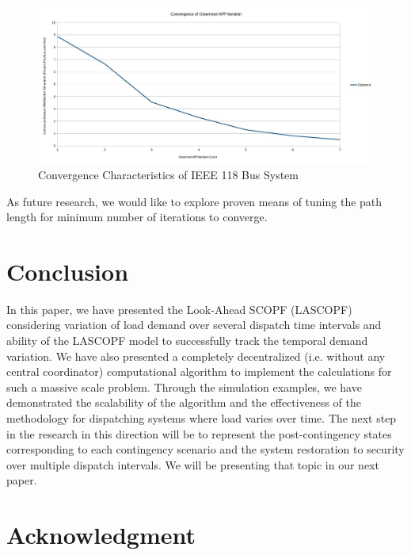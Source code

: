 \documentclass[preprint,12pt,3p]{elsarticle}
\begin{document}
	\begin{figure}
		\begin{center}
			\includegraphics[width=0.92\linewidth,trim=5mm 12mm 5mm 5mm, clip]{N-1_SCOPF_118_Bus.jpg}
			\caption{Convergence Characteristics of IEEE 118 Bus System}
			\label{118Conv}
		\end{center}
	\end{figure}
	\fi
	As future research, we would like to explore proven means of tuning the path length for minimum number of iterations to converge.
	\section{Conclusion}
	\label{conclusion}
	In this paper, we have presented the Look-Ahead SCOPF (LASCOPF) considering variation of load demand over several dispatch time intervals and ability of the LASCOPF model to successfully track the temporal demand variation. We have also presented a completely decentralized (i.e. without any central coordinator) computational algorithm to implement the calculations for such a massive scale problem. Through the simulation examples, we have demonstrated the scalability of the algorithm and the effectiveness of the methodology for dispatching systems where load varies over time. The next step in the research in this direction will be to represent the post-contingency states corresponding to each contingency scenario and the system restoration to security over multiple dispatch intervals. We will be presenting that topic in our next paper.
	
	\appendix
	
	\section{Acknowledgment}
	
\end{document}
